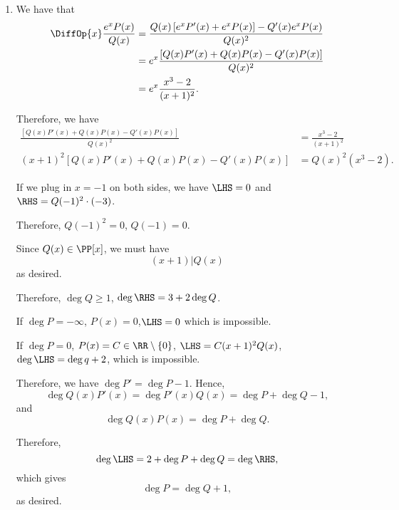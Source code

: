 \Question{\currfilebase}

\begin{enumerate}
    \item We have that
          \begin{align*}
              \DiffOp{x} \frac{e^x P(x)}{Q(x)} & = \frac{Q(x) \left[e^x P'(x) + e^x P(x)\right] - Q'(x) e^x P(x)}{Q(x)^2} \\
                                               & = e^x \frac{\left[Q(x)P'(x) + Q(x)P(x) - Q'(x)P(x)\right]}{Q(x)^2}       \\
                                               & = e^x \frac{x^3 - 2}{(x + 1)^2}.
          \end{align*}

          Therefore, we have
          \begin{align*}
              \frac{\left[Q(x)P'(x) + Q(x)P(x) - Q'(x)P(x)\right]}{Q(x)^2} & = \frac{x^3 - 2}{(x + 1)^2}    \\
              (x+1)^2 \left[Q(x)P'(x) + Q(x)P(x) - Q'(x)P(x)\right]        & = Q(x)^2 \left(x^3 - 2\right).
          \end{align*}

          If we plug in \(x = -1\) on both sides, we have \(\LHS = 0\) and \(\RHS = Q(-1)^2 \cdot (-3)\).

          Therefore, \(Q(-1)^2 = 0\), \(Q(-1) = 0\).

          Since \(Q(x) \in \PP[x]\), we must have
          \[
              (x + 1) | Q(x)
          \]
          as desired.

          Therefore, \(\deg Q \geq 1\), \(\deg \RHS = 3 + 2 \deg Q\).

          If \(\deg P = -\infty\), \(P(x) = 0\),\(\LHS = 0\) which is impossible.

          If \(\deg P = 0\), \(P(x) = C \in \RR \setminus \{0\}\), \(\LHS = C(x + 1)^2 Q(x)\), \(\deg \LHS = \deg q + 2\), which is impossible.

          Therefore, we have \(\deg P' = \deg P - 1\).
          Hence,
          \[
              \deg Q(x) P'(x) = \deg P'(x) Q(x) = \deg P + \deg Q - 1,
          \]
          and
          \[
              \deg Q(x) P(x) = \deg P + \deg Q.
          \]

          Therefore,
          \[
              \deg \LHS = 2 + \deg P + \deg Q = \deg \RHS,
          \]
          which gives
          \[
              \deg P = \deg Q + 1,
          \]
          as desired.


\end{enumerate}
